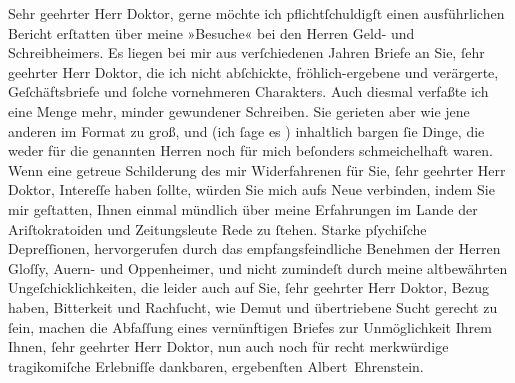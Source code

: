 \pstart{}Sehr geehrter Herr Doktor,\pend\vspace{0.5em}
\pstart
           gerne möchte ich pflichtſchuldigſt einen ausführlichen Bericht erſtatten über meine
               »Besuche« bei den Herren Geld- und Schreibheimers. Es liegen bei mir aus verſchiedenen Jahren Briefe
               an Sie,{ }ſehr geehrter Herr Doktor, die ich nicht abſchickte, fröhlich-ergebene und
               verärgerte, Geſchäftsbriefe und{ }ſolche vornehmeren Charakters. Auch diesmal verfaßte
               ich eine Menge mehr, minder gewundener Schreiben. Sie gerieten aber wie jene anderen
               im Format zu groß, und (ich{ }ſage es \label{K_L01835-1v}\label{K_L01835-1}) {\pb}inhaltlich bargen{ }ſie Dinge, die weder für die genannten Herren noch für mich
               beſonders schmeichelhaft waren. Wenn eine getreue Schilderung des mir Widerfahrenen
               für Sie,{ }ſehr geehrter Herr Doktor, Intereſſe haben{ }ſollte, würden Sie mich aufs Neue
               verbinden, indem Sie mir geſtatten, Ihnen einmal mündlich über meine Erfahrungen im
               Lande der Ariſtokratoiden und Zeitungsleute Rede zu{ }ſtehen. Starke pſychiſche
               Depreſſionen, hervorgerufen durch das empfangsfeindliche Benehmen der Herren Gloſſy, Auern- und Oppenheimer, und {\pb}nicht zumindeſt durch meine altbewährten
               Ungeſchicklichkeiten, die leider auch auf Sie,{ }ſehr geehrter Herr Doktor, Bezug
               haben, Bitterkeit und Rachſucht, wie Demut und übertriebene Sucht gerecht zu{ }ſein,
               machen die Abfaſſung eines vernünftigen Briefes zur Unmöglichkeit Ihrem Ihnen,{ }ſehr
               geehrter Herr Doktor, nun auch noch für recht merkwürdige tragikomiſche Erlebniſſe
               dankbaren, ergebenſten\pend
           \pstart \spacefill\mbox{Albert Ehrenstein.}\pend{}\endnumbering{}  \newcommand{\dateiname}{L01835}\newcommand{\titel}{Albert Ehrenstein an Arthur Schnitzler, 27. 3. 1909}\newcommand{\editorInnen}{Martin Anton Müller und Gerd-Hermann Susen}
